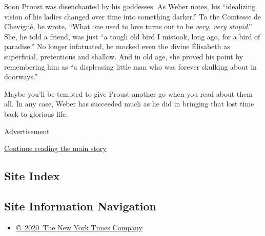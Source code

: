 Soon Proust was disenchanted by his goddesses. As Weber notes, his
``idealizing vision of his ladies changed over time into something
darker.'' To the Comtesse de Chevigné, he wrote, ``What one used to love
turns out to be \emph{very, very stupid}.'' She, he told a friend, was
just ``a tough old bird I mistook, long ago, for a bird of paradise.''
No longer infatuated, he mocked even the divine Élisabeth as
superficial, pretentious and shallow. And in old age, she proved his
point by remembering him as ``a displeasing little man who was forever
skulking about in doorways.''

Maybe you'll be tempted to give Proust another go when you read about
them all. In any case, Weber has succeeded much as he did in bringing
that lost time back to glorious life.

Advertisement

\protect\hyperlink{after-bottom}{Continue reading the main story}

\hypertarget{site-index}{%
\subsection{Site Index}\label{site-index}}

\hypertarget{site-information-navigation}{%
\subsection{Site Information
Navigation}\label{site-information-navigation}}

\begin{itemize}
\tightlist
\item
  \href{https://help.nytimes3xbfgragh.onion/hc/en-us/articles/115014792127-Copyright-notice}{©~2020~The
  New York Times Company}
\end{itemize}

